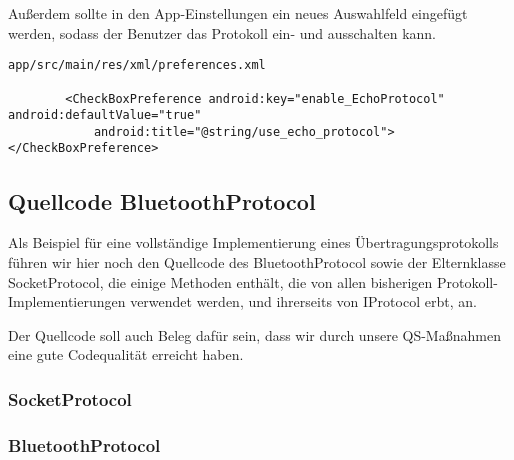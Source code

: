 Außerdem sollte in den App-Einstellungen ein neues Auswahlfeld eingefügt werden, sodass der Benutzer das Protokoll ein- und ausschalten kann.

\begin{lstlisting}
app/src/main/res/xml/preferences.xml

        <CheckBoxPreference android:key="enable_EchoProtocol" android:defaultValue="true"
            android:title="@string/use_echo_protocol"></CheckBoxPreference>
\end{lstlisting}




\subsection{Quellcode BluetoothProtocol}

Als Beispiel für eine vollständige Implementierung eines Übertragungsprotokolls führen wir hier noch den Quellcode des BluetoothProtocol sowie der Elternklasse SocketProtocol, die einige Methoden enthält, die von allen bisherigen Protokoll-Implementierungen verwendet werden, und ihrerseits von IProtocol erbt, an.

Der Quellcode soll auch Beleg dafür sein, dass wir durch unsere QS-Maßnahmen eine gute Codequalität erreicht haben.

\subsubsection{SocketProtocol}


\subsubsection{BluetoothProtocol}



